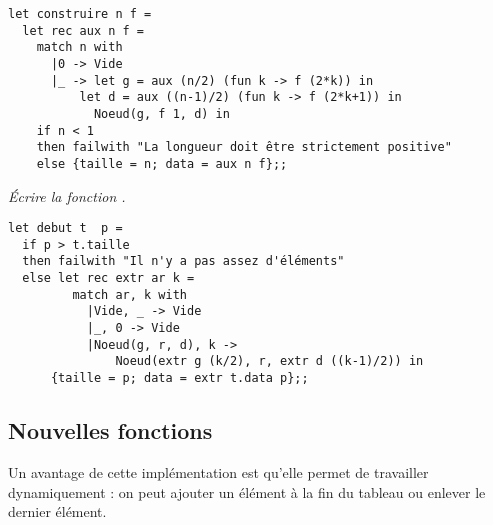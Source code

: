 \begin{Answer}
\begin{lstlisting}
let construire n f =
  let rec aux n f =
    match n with
      |0 -> Vide
      |_ -> let g = aux (n/2) (fun k -> f (2*k)) in
          let d = aux ((n-1)/2) (fun k -> f (2*k+1)) in
            Noeud(g, f 1, d) in
    if n < 1
    then failwith "La longueur doit être strictement positive"
    else {taille = n; data = aux n f};;
\end{lstlisting}
\end{Answer}
\begin{Exercise}[title = Extraction]\it 
Écrire la fonction .
\end{Exercise}
\begin{Answer}
\begin{lstlisting}
let debut t  p = 
  if p > t.taille
  then failwith "Il n'y a pas assez d'éléments"
  else let rec extr ar k =
         match ar, k with 
           |Vide, _ -> Vide
           |_, 0 -> Vide
           |Noeud(g, r, d), k -> 
               Noeud(extr g (k/2), r, extr d ((k-1)/2)) in 
      {taille = p; data = extr t.data p};;
\end{lstlisting}
\end{Answer}
\subsection{Nouvelles fonctions}
Un avantage de cette implémentation est qu'elle permet de travailler dynamiquement : on peut ajouter un élément à la fin du tableau ou enlever le dernier élément.

